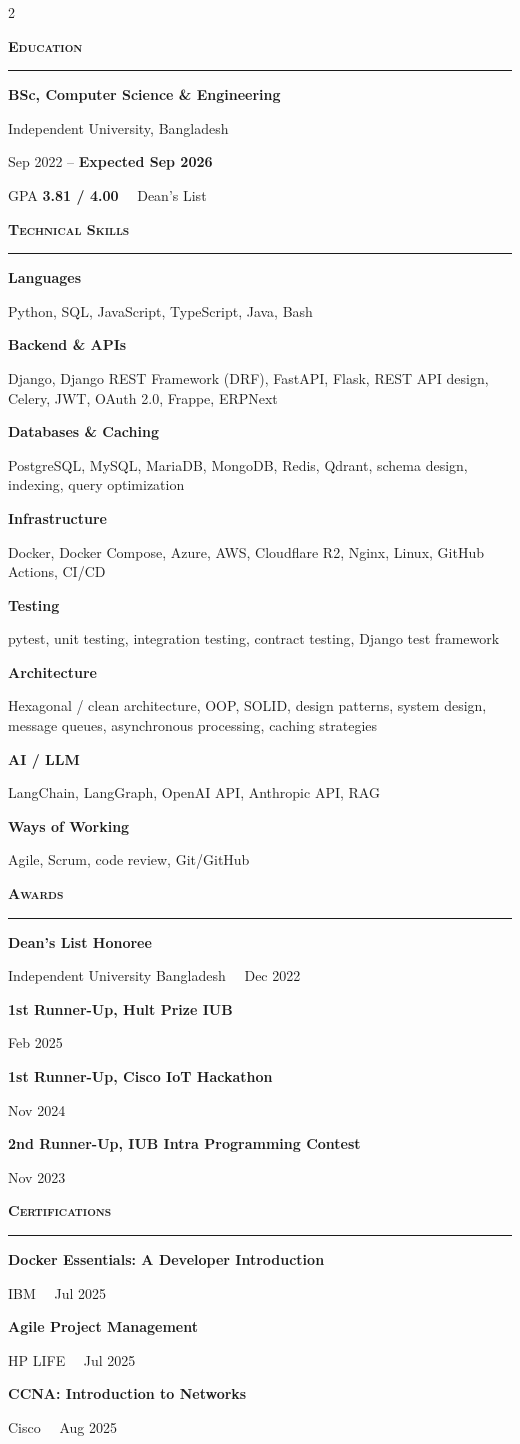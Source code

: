 \documentclass[a4paper,10pt]{article}
\newcommand{\dotsep}{\ \textperiodcentered\ }
\newcommand{\cvsection}[1]{%
  \vspace{7pt}%
  {\color{accent}\bfseries\scshape\large #1}\par
  \vspace{1pt}%
  \noindent\textcolor{hairline}{\rule{\linewidth}{0.7pt}}\par
  \vspace{4pt}}
\newcommand{\skillgroup}[2]{%
  {\bfseries\small #1}\par{\small #2}\par\vspace{4pt}}
\newcommand{\award}[2]{%
  {\small\bfseries #1}\par{\footnotesize\color{soft} #2}\par\vspace{3.5pt}}
\begin{document}
\begin{paracol}{2}
\switchcolumn

\cvsection{Education}
{\bfseries BSc, Computer Science \& Engineering}\par
{\small\color{accent} Independent University, Bangladesh}\par
{\small Sep 2022 -- \textbf{Expected Sep 2026}}\par
{\small GPA \textbf{3.81 / 4.00} \dotsep Dean's List}

\cvsection{Technical Skills}
\skillgroup{Languages}{Python, SQL, JavaScript, TypeScript, Java, Bash}
\skillgroup{Backend \& APIs}{Django, Django REST Framework (DRF), FastAPI, Flask, REST API design, Celery, JWT, OAuth 2.0, Frappe, ERPNext}
\skillgroup{Databases \& Caching}{PostgreSQL, MySQL, MariaDB, MongoDB, Redis, Qdrant, schema design, indexing, query optimization}
\skillgroup{Infrastructure}{Docker, Docker Compose, Azure, AWS, Cloudflare R2, Nginx, Linux, GitHub Actions, CI/CD}
\skillgroup{Testing}{pytest, unit testing, integration testing, contract testing, Django test framework}
\skillgroup{Architecture}{Hexagonal / clean architecture, OOP, SOLID, design patterns, system design, message queues, asynchronous processing, caching strategies}
\skillgroup{AI / LLM}{LangChain, LangGraph, OpenAI API, Anthropic API, RAG}
\skillgroup{Ways of Working}{Agile, Scrum, code review, Git/GitHub}

\cvsection{Awards}
\award{Dean's List Honoree}{Independent University Bangladesh \dotsep Dec 2022}
\award{1st Runner-Up, Hult Prize IUB}{Feb 2025}
\award{1st Runner-Up, Cisco IoT Hackathon}{Nov 2024}
\award{2nd Runner-Up, IUB Intra Programming Contest}{Nov 2023}

\cvsection{Certifications}
\award{Docker Essentials: A Developer Introduction}{IBM \dotsep Jul 2025}
\award{Agile Project Management}{HP LIFE \dotsep Jul 2025}
\award{CCNA: Introduction to Networks}{Cisco \dotsep Aug 2025}

\end{paracol}
\end{document}
